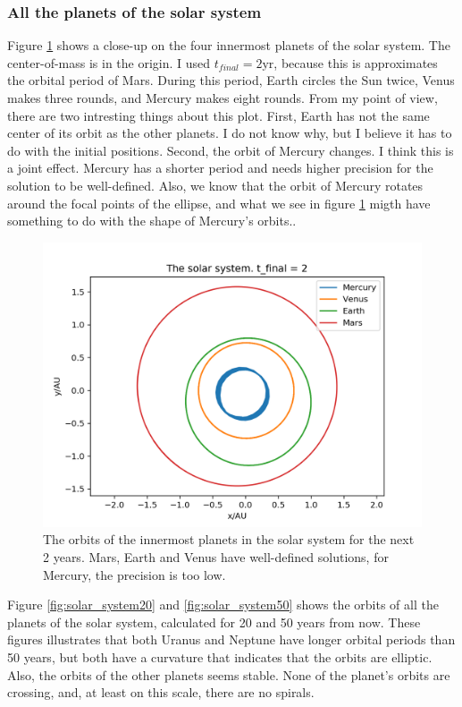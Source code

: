 \documentclass{article}
\begin{document}
\subsubsection{All the planets of the solar system}
Figure \ref{fig:solar_system2} shows a close-up on the four innermost planets of the solar system. The center-of-mass is in the origin. I used $t_{final} = 2 \textrm{yr}$, because this is approximates the orbital period of Mars. During this period, Earth circles the Sun twice, Venus makes three rounds, and Mercury makes eight rounds. From my point of view, there are two intresting things about this plot. First, Earth has not the same center of its orbit as the other planets. I do not know why, but I believe it has to do with the initial positions. Second, the orbit of Mercury changes. I think this is a joint effect. Mercury has a shorter period and needs higher precision for the solution to be well-defined. Also, we know that the orbit of Mercury rotates around the focal points of the ellipse, and what we see in figure \ref{fig:solar_system2} migth have something to do with the shape of Mercury's orbits..
\begin{figure}
  \includegraphics[width=\linewidth]{solar_system2.png}
  \caption{The orbits of the innermost planets in the solar system for the next 2 years. Mars, Earth and Venus have well-defined solutions, for Mercury, the precision is too low.}
  \label{fig:solar_system2}
\end{figure}

Figure \ref{fig:solar_system20} and \ref{fig:solar_system50} shows the orbits of all the planets of the solar system, calculated for 20 and 50 years from now.   These figures illustrates that both Uranus and Neptune have longer orbital periods than 50 years, but both have a curvature that indicates that the orbits are elliptic. Also, the orbits of the other planets seems stable. None of the planet's orbits are crossing, and, at least on this scale, there are no spirals. 
\end{document}
